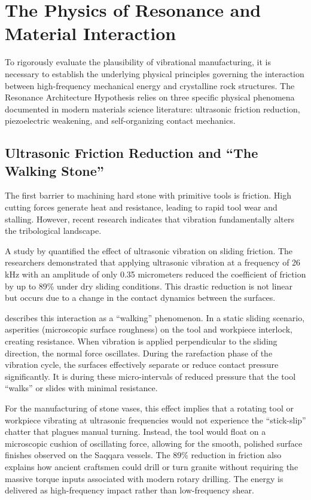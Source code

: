 \documentclass[11pt]{article}
\begin{document}
\section{The Physics of Resonance and Material Interaction}

To rigorously evaluate the plausibility of vibrational manufacturing, it is necessary to establish the underlying physical principles governing the interaction between high-frequency mechanical energy and crystalline rock structures. The Resonance Architecture Hypothesis relies on three specific physical phenomena documented in modern materials science literature: ultrasonic friction reduction, piezoelectric weakening, and self-organizing contact mechanics.

\subsection{Ultrasonic Friction Reduction and ``The Walking Stone''}

The first barrier to machining hard stone with primitive tools is friction. High cutting forces generate heat and resistance, leading to rapid tool wear and stalling. However, recent research indicates that vibration fundamentally alters the tribological landscape.

A study by \citet{Luo2024} quantified the effect of ultrasonic vibration on sliding friction. The researchers demonstrated that applying ultrasonic vibration at a frequency of 26 kHz with an amplitude of only 0.35 micrometers reduced the coefficient of friction by up to 89\% under dry sliding conditions. This drastic reduction is not linear but occurs due to a change in the contact dynamics between the surfaces.

\citet{Popov2020} describes this interaction as a ``walking'' phenomenon. In a static sliding scenario, asperities (microscopic surface roughness) on the tool and workpiece interlock, creating resistance. When vibration is applied perpendicular to the sliding direction, the normal force oscillates. During the rarefaction phase of the vibration cycle, the surfaces effectively separate or reduce contact pressure significantly. It is during these micro-intervals of reduced pressure that the tool ``walks'' or slides with minimal resistance.

For the manufacturing of stone vases, this effect implies that a rotating tool or workpiece vibrating at ultrasonic frequencies would not experience the ``stick-slip'' chatter that plagues manual turning. Instead, the tool would float on a microscopic cushion of oscillating force, allowing for the smooth, polished surface finishes observed on the Saqqara vessels. The 89\% reduction in friction also explains how ancient craftsmen could drill or turn granite without requiring the massive torque inputs associated with modern rotary drilling. The energy is delivered as high-frequency impact rather than low-frequency shear.
\end{document}
